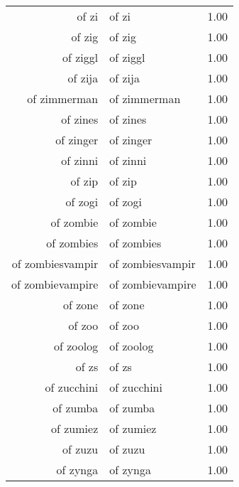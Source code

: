 \begin{table}[ht]
\begin{tabular}{rlr}
  of zi & of zi & 1.00 \\ 
  of zig & of zig & 1.00 \\ 
  of ziggl & of ziggl & 1.00 \\ 
  of zija & of zija & 1.00 \\ 
  of zimmerman & of zimmerman & 1.00 \\ 
  of zines & of zines & 1.00 \\ 
  of zinger & of zinger & 1.00 \\ 
  of zinni & of zinni & 1.00 \\ 
  of zip & of zip & 1.00 \\ 
  of zogi & of zogi & 1.00 \\ 
  of zombie & of zombie & 1.00 \\ 
  of zombies & of zombies & 1.00 \\ 
  of zombiesvampir & of zombiesvampir & 1.00 \\ 
  of zombievampire & of zombievampire & 1.00 \\ 
  of zone & of zone & 1.00 \\ 
  of zoo & of zoo & 1.00 \\ 
  of zoolog & of zoolog & 1.00 \\ 
  of zs & of zs & 1.00 \\ 
  of zucchini & of zucchini & 1.00 \\ 
  of zumba & of zumba & 1.00 \\ 
  of zumiez & of zumiez & 1.00 \\ 
  of zuzu & of zuzu & 1.00 \\ 
  of zynga & of zynga & 1.00 \\ 
   \hline
\end{tabular}
\end{table}
